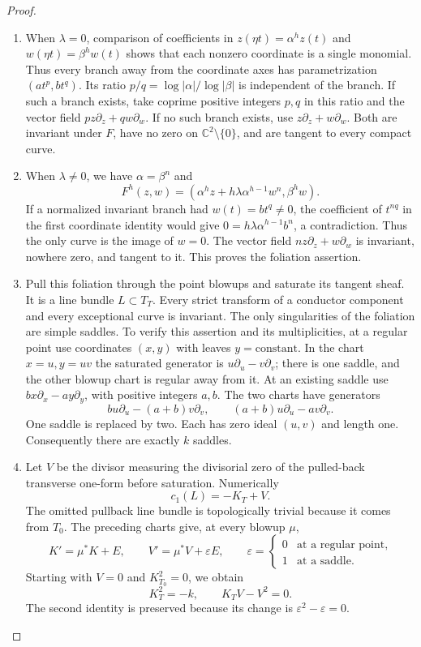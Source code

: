 \begin{proof}
\begin{enumerate}[label={$\langle1\rangle$\arabic*.},leftmargin=*]
\item When $\lambda=0$, comparison of coefficients in
$z(\eta t)=\alpha^h z(t)$ and
$w(\eta t)=\beta^h w(t)$ shows that each
nonzero coordinate is a single monomial.
Thus every branch away from the coordinate axes
has parametrization $(a t^p,b t^q)$. Its ratio
$p/q=\log|\alpha|/\log|\beta|$ is independent
of the branch. If such a branch exists, take
coprime positive integers $p,q$ in this ratio
and the vector field
$p z\partial_z+q w\partial_w$.
If no such branch exists, use
$z\partial_z+w\partial_w$.
Both are invariant under $F$, have no zero on
$\mathbb C^2\setminus\{0\}$, and are tangent
to every compact curve.

\item When $\lambda\ne0$, we have $\alpha=\beta^n$ and
\[
 F^h(z,w)=
 (\alpha^h z+h\lambda\alpha^{h-1}w^n,\beta^h w).
\]
If a normalized invariant branch had
$w(t)=b t^q\ne0$, the coefficient of $t^{nq}$
in the first coordinate identity would give
$0=h\lambda\alpha^{h-1}b^n$, a contradiction.
Thus the only curve is the image of $w=0$.
The vector field $n z\partial_z+w\partial_w$
is invariant, nowhere zero, and tangent to it.
This proves the foliation assertion.

\item Pull this foliation through the point blowups
and saturate its tangent sheaf. It is a line
bundle $L\subset T_T$. Every strict transform
of a conductor component and every exceptional
curve is invariant. The only singularities of
the foliation are simple saddles. To verify
this assertion and its multiplicities, at a
regular point use coordinates $(x,y)$ with
leaves $y=\text{constant}$. In the chart
$x=u,y=uv$ the saturated generator is
$u\partial_u-v\partial_v$; there is one
saddle, and the other blowup chart is regular
away from it. At an existing saddle use
$b x\partial_x-a y\partial_y$, with positive
integers $a,b$. The two charts have generators
\[
 b u\partial_u-(a+b)v\partial_v,\qquad
 (a+b)u\partial_u-a v\partial_v.
\]
One saddle is replaced by two. Each has
zero ideal $(u,v)$ and length one.
Consequently there are exactly $k$ saddles.

\item Let $V$ be the divisor measuring the
divisorial zero of the pulled-back transverse
one-form before saturation. Numerically
\[
 c_1(L)=-K_T+V.
\]
The omitted pullback line bundle is topologically
trivial because it comes from $T_0$.
The preceding charts give, at every blowup $\mu$,
\[
 K'=\mu^*K+E,\qquad
 V'=\mu^*V+\varepsilon E,\qquad
 \varepsilon=
 \begin{cases}0&\text{at a regular point},\\
 1&\text{at a saddle}.
 \end{cases}
\]
Starting with $V=0$ and $K_{T_0}^2=0$, we obtain
\[
 K_T^2=-k,\qquad K_TV-V^2=0.
\]
The second identity is preserved because its
change is $\varepsilon^2-\varepsilon=0$.


\end{enumerate}
\end{proof}
